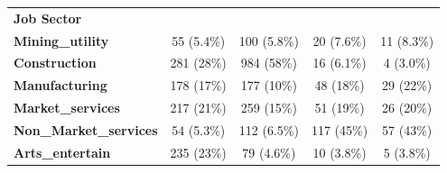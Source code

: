 \begin{table}
{\begin{tabular}[t]{>{}lcccc}
\textbf{Job Sector} &  &  &  & \\
\textbf{Mining\_utility} & 55 (5.4\%) & 100 (5.8\%) & 20 (7.6\%) & 11 (8.3\%)\\
\addlinespace
\textbf{Construction} & 281 (28\%) & 984 (58\%) & 16 (6.1\%) & 4 (3.0\%)\\
\textbf{Manufacturing} & 178 (17\%) & 177 (10\%) & 48 (18\%) & 29 (22\%)\\
\textbf{Market\_services} & 217 (21\%) & 259 (15\%) & 51 (19\%) & 26 (20\%)\\
\textbf{Non\_Market\_services} & 54 (5.3\%) & 112 (6.5\%) & 117 (45\%) & 57 (43\%)\\
\textbf{Arts\_entertain} & 235 (23\%) & 79 (4.6\%) & 10 (3.8\%) & 5 (3.8\%)\\
\bottomrule
\end{tabular}}
\end{table}\newpage
